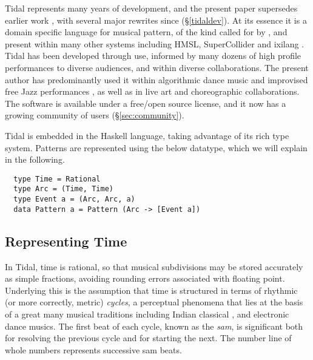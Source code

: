 \documentclass[authoryear,preprint]{sigplanconf}
\begin{document}
Tidal represents many years of development, and the present paper
supersedes earlier work \citep{McLean10d}, with several major rewrites
since (\S \ref{tidaldev}). At its essence it is a domain specific
language for musical pattern, of the kind called for by
\citet{Spiegel81}, and present within many other systems including
HMSL, SuperCollider \citep{McCartney02} and ixilang
\citep{Magnusson11b}. Tidal has been developed through use, informed
by many dozens of high profile performances to diverse audiences, and
within diverse collaborations. The present author has predominantly
used it within algorithmic dance music \citep[algorave; ]{Collins14}
and improvised free Jazz performances \citep{Hession14}, as well as in
live art \citep{McLean12a} and choreographic \citep{McLean14}
collaborations. The software is available under a free/open source
license, and it now has a growing community of users (\S \ref{sec:community}).

Tidal is embedded in the Haskell language, taking advantage of its
rich type system. Patterns are represented using the below datatype,
which we will explain in the following.

\begin{center}
\begin{minipage}{0.5\textwidth}
\begin{lstlisting}
  type Time = Rational
  type Arc = (Time, Time)
  type Event a = (Arc, Arc, a)
  data Pattern a = Pattern (Arc -> [Event a])
\end{lstlisting}
\end{minipage}
\end{center}

\subsection{Representing Time}

In Tidal, time is rational, so that musical subdivisions may be stored
accurately as simple fractions, avoiding rounding errors associated
with floating point. Underlying this is the assumption that time is
structured in terms of rhythmic (or more correctly, metric)
\emph{cycles}, a perceptual phenomena that lies at the basis of a
great many musical traditions including Indian classical
\citep{Clayton08}, and electronic dance musics. The first beat of each
cycle, known as the \emph{sam}, is significant both for resolving the
previous cycle and for starting the next. The number line of whole
numbers represents successive sam beats.
\end{document}
